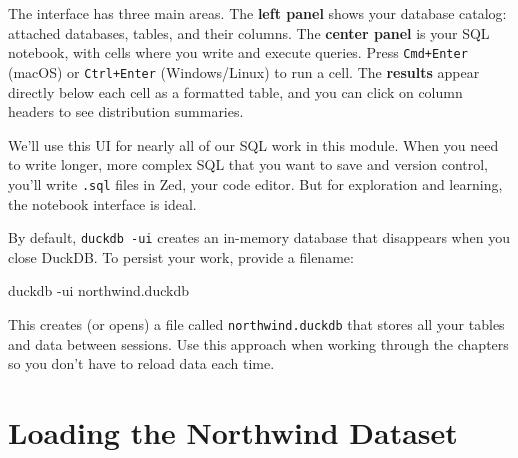 \documentclass[
  letterpaper,
  DIV=11,
  numbers=noendperiod]{scrreprt}
\newenvironment{Shaded}{\begin{snugshade}}{\end{snugshade}}
\newcommand{\AttributeTok}[1]{\textcolor[rgb]{0.40,0.45,0.13}{#1}}
\newcommand{\ExtensionTok}[1]{\textcolor[rgb]{0.00,0.23,0.31}{#1}}
\newcommand{\NormalTok}[1]{\textcolor[rgb]{0.00,0.23,0.31}{#1}}
\begin{document}
The interface has three main areas. The \textbf{left panel} shows your
database catalog: attached databases, tables, and their columns. The
\textbf{center panel} is your SQL notebook, with cells where you write
and execute queries. Press \texttt{Cmd+Enter} (macOS) or
\texttt{Ctrl+Enter} (Windows/Linux) to run a cell. The \textbf{results}
appear directly below each cell as a formatted table, and you can click
on column headers to see distribution summaries.

We'll use this UI for nearly all of our SQL work in this module. When
you need to write longer, more complex SQL that you want to save and
version control, you'll write \texttt{.sql} files in Zed, your code
editor. But for exploration and learning, the notebook interface is
ideal.

\begin{tcolorbox}[enhanced jigsaw, opacitybacktitle=0.6, arc=.35mm, colback=white, bottomtitle=1mm, opacityback=0, toprule=.15mm, left=2mm, colbacktitle=quarto-callout-tip-color!10!white, breakable, coltitle=black, toptitle=1mm, colframe=quarto-callout-tip-color-frame, bottomrule=.15mm, titlerule=0mm, title=\textcolor{quarto-callout-tip-color}{\faLightbulb}\hspace{0.5em}{Persistent Databases}, rightrule=.15mm, leftrule=.75mm]

By default, \texttt{duckdb\ -ui} creates an in-memory database that
disappears when you close DuckDB. To persist your work, provide a
filename:

\begin{codelisting}[H]

\caption{\texttt{terminal}}

\begin{Shaded}
\begin{Highlighting}[]
\ExtensionTok{duckdb} \AttributeTok{{-}ui}\NormalTok{ northwind.duckdb}
\end{Highlighting}
\end{Shaded}

\end{codelisting}

This creates (or opens) a file called \texttt{northwind.duckdb} that
stores all your tables and data between sessions. Use this approach when
working through the chapters so you don't have to reload data each time.

\end{tcolorbox}

\section{Loading the Northwind
Dataset}\label{loading-the-northwind-dataset}
\end{document}
